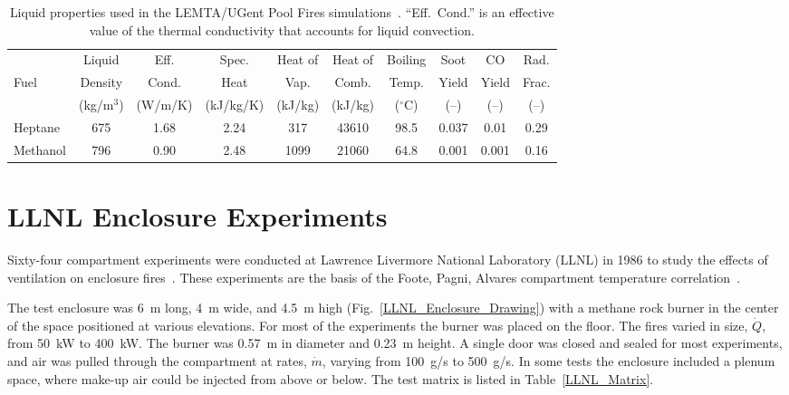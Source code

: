 \begin{table}[!htb]
\caption[Liquid properties used in the LEMTA/UGent Pool Fires simulations]{Liquid properties used in the LEMTA/UGent Pool Fires simulations~\cite{Sikanen:2016}. ``Eff.~Cond.'' is an effective value of the thermal conductivity that accounts for liquid convection.}
\begin{center}
\begin{tabular}{|l|c|c|c|c|c|c|c|c|c|}
\hline
           & Liquid     & Eff.     & Spec.         & Heat of        & Heat of      & Boiling       & Soot   & CO     & Rad.     \\
Fuel       & Density    & Cond.    & Heat          & Vap.           & Comb.        & Temp.         & Yield  & Yield  & Frac.    \\
           & (kg/m$^3$) & (W/m/K)  & (kJ/kg/K)     & (kJ/kg)        & (kJ/kg)      & ($^\circ$C)   & (--)   & (--)   & (--)     \\ \hline \hline
Heptane    & 675        & 1.68     & 2.24          & 317            & 43610        & 98.5          & 0.037  & 0.01   & 0.29     \\ \hline
Methanol   & 796        & 0.90     & 2.48          & 1099           & 21060        & 64.8          & 0.001  & 0.001  & 0.16     \\ \hline
\end{tabular}
\end{center}
\label{LEMTA_UGent_Fuels}
\end{table}


\section{LLNL Enclosure Experiments}
\label{LLNL_Enclosure_Description}

Sixty-four compartment experiments were conducted at Lawrence Livermore National Laboratory (LLNL) in 1986 to study the effects of ventilation on enclosure fires~\cite{Foote:LLNL1986}. These experiments are the basis of the Foote, Pagni, Alvares compartment temperature correlation~\cite{Foote:IAFSS1}.

The test enclosure was 6~m long, 4~m wide, and 4.5~m high (Fig.~\ref{LLNL_Enclosure_Drawing}) with a methane rock burner in the center of the space positioned at various elevations. For most of the experiments the burner was placed on the floor. The fires varied in size, $\dot{Q}$, from 50~kW to 400~kW. The burner was 0.57~m in diameter and 0.23~m height. A single door was closed and sealed for most experiments, and air was pulled through the compartment at rates, $\dot{m}$, varying from 100~g/s to 500~g/s. In some tests the enclosure included a plenum space, where make-up air could be injected from above or below. The test matrix is listed in Table~\ref{LLNL_Matrix}.

